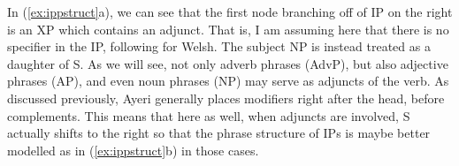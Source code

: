 In (\ref{ex:ippstruct}a), we can see that the first node branching off of IP on
the right is an XP which contains an adjunct. That is, I am assuming here that
there is no specifier in the IP, following \citet[130]{bresnan2016} for Welsh.
The subject NP is instead treated as a daughter of S. As we will see, not only
adverb phrases (AdvP), but also adjective phrases (AP), and even noun phrases
(NP) may serve as adjuncts of the verb. As discussed previously, Ayeri
generally places modifiers right after the head, before complements. This means
that here as well, when adjuncts are involved, S actually shifts to the right
so that the phrase structure of IPs is maybe better modelled as in 
(\ref{ex:ippstruct}b) in those cases.

\begin{figure}
\begin{morphlex}
\ex\label{ex:inflmorphlex}%
\xe
\end{morphlex}
\end{figure}

